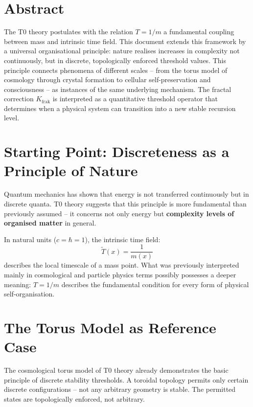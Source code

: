 
\section*{Abstract}

	The T0 theory postulates with the relation $T = 1/m$ a fundamental coupling between mass and intrinsic time field. This document extends this framework by a universal organisational principle: nature realises increases in complexity not continuously, but in discrete, topologically enforced threshold values. This principle connects phenomena of different scales -- from the torus model of cosmology through crystal formation to cellular self-preservation and consciousness -- as instances of the same underlying mechanism. The fractal correction $K_{\text{frak}}$ is interpreted as a quantitative threshold operator that determines when a physical system can transition into a new stable recursion level.

	
	\section{Starting Point: Discreteness as a Principle of Nature}
	
	Quantum mechanics has shown that energy is not transferred continuously but in discrete quanta. T0 theory suggests that this principle is more fundamental than previously assumed -- it concerns not only energy but \textbf{complexity levels of organised matter} in general.
	
	In natural units ($c = \hbar = 1$), the intrinsic time field:
	\begin{equation}
		\tilde{T}(x) = \frac{1}{m(x)}
	\end{equation}
	describes the local timescale of a mass point. What was previously interpreted mainly in cosmological and particle physics terms possibly possesses a deeper meaning: $T = 1/m$ describes the fundamental condition for every form of physical self-organisation.
	
	\section{The Torus Model as Reference Case}
	
	The cosmological torus model of T0 theory already demonstrates the basic principle of discrete stability thresholds. A toroidal topology permits only certain discrete configurations -- not any arbitrary geometry is stable. The permitted states are topologically enforced, not arbitrary.
	
